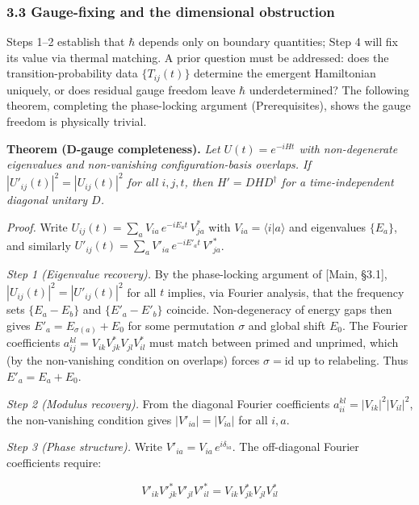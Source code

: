 \documentclass[
]{article}
\begin{document}
\hypertarget{gauge-fixing-and-the-dimensional-obstruction}{%
\subsubsection{3.3 Gauge-fixing and the dimensional
obstruction}\label{gauge-fixing-and-the-dimensional-obstruction}}

Steps 1--2 establish that \(\hbar\) depends only on boundary quantities;
Step 4 will fix its value via thermal matching. A prior question must be
addressed: does the transition-probability data \(\{T_{ij}(t)\}\)
determine the emergent Hamiltonian uniquely, or does residual gauge
freedom leave \(\hbar\) underdetermined? The following theorem,
completing the phase-locking argument (Prerequisites), shows the gauge
freedom is physically trivial.

\textbf{Theorem (D-gauge completeness).} \emph{Let \(U(t) = e^{-iHt}\)
with non-degenerate eigenvalues and non-vanishing configuration-basis
overlaps. If \(|U'_{ij}(t)|^2 = |U_{ij}(t)|^2\) for all \(i, j, t\),
then \(H' = DHD^\dagger\) for a time-independent diagonal unitary
\(D\).}

\emph{Proof.} Write
\(U_{ij}(t) = \sum_a V_{ia} \, e^{-iE_a t} \, V_{ja}^*\) with
\(V_{ia} = \langle i | a \rangle\) and eigenvalues \(\{E_a\}\), and
similarly \(U'_{ij}(t) = \sum_a V'_{ia} \, e^{-iE'_a t} \, V'^*_{ja}\).

\emph{Step 1 (Eigenvalue recovery).} By the phase-locking argument of
{[}Main, §3.1{]}, \(|U_{ij}(t)|^2 = |U'_{ij}(t)|^2\) for all \(t\)
implies, via Fourier analysis, that the frequency sets \(\{E_a - E_b\}\)
and \(\{E'_a - E'_b\}\) coincide. Non-degeneracy of energy gaps then
gives \(E'_a = E_{\sigma(a)} + E_0\) for some permutation \(\sigma\) and
global shift \(E_0\). The Fourier coefficients
\(a^{kl}_{ij} = V_{ik} V^*_{jk} V_{jl} V^*_{il}\) must match between
primed and unprimed, which (by the non-vanishing condition on overlaps)
forces \(\sigma = \text{id}\) up to relabeling. Thus
\(E'_a = E_a + E_0\).

\emph{Step 2 (Modulus recovery).} From the diagonal Fourier coefficients
\(a^{kl}_{ii} = |V_{ik}|^2 |V_{il}|^2\), the non-vanishing condition
gives \(|V'_{ia}| = |V_{ia}|\) for all \(i, a\).

\emph{Step 3 (Phase structure).} Write
\(V'_{ia} = V_{ia} \, e^{i\delta_{ia}}\). The off-diagonal Fourier
coefficients require:

\[V'_{ik} V'^*_{jk} V'_{jl} V'^*_{il} = V_{ik} V^*_{jk} V_{jl} V^*_{il}\]
\end{document}
